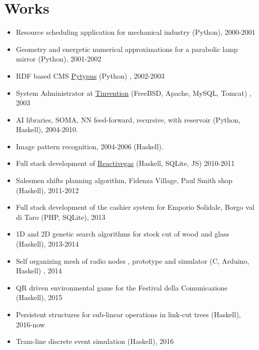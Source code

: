 \documentclass[letterpaper,10pt,oneside]{article}
\begin{document}
    \section*{Works}
        \begin{itemize}
            \item Resource scheduling application for mechanical industry (Python), 2000-2001 
            \item Geometry and energetic numerical approximations for a parabolic lamp mirror    (Python), 2001-2002 
            \item RDF based CMS \href{http://pytypus.cvs.sourceforge.net/viewvc/pytypus/}{Pytypus}  (Python) , 2002-2003 
            \item System Administrator at \href{http://tinvention.net}{Tinvention} (FreeBSD, Apache, MySQL, Tomcat) , 2003
            \item AI libraries, SOMA, NN feed-forward, recursive, with reservoir (Python, Haskell), 2004-2010. 
            \item Image pattern recognition, 2004-2006 (Haskell). 
            \item Full stack development of \href {https://lambdasistemi.net/reactivegas}{Reactivegas} (Haskell, SQLite, JS) 2010-2011 
            \item Salesmen shifts planning algorithm, Fidenza Village, Paul Smith shop (Haskell), 2011-2012 
            \item Full stack development of the cashier system for Emporio Solidale, Borgo val di Taro (PHP, SQLite), 2013 
            \item 1D and 2D genetic search algorithms for stock cut of wood and glass (Haskell), 2013-2014 
            \item Self organizing mesh of radio nodes , prototype and simulator (C, Arduino, Haskell) , 2014 
            \item QR driven environmental game for the Festival della Comunicazione (Haskell), 2015 
            \item Persistent structures for sub-linear operations in link-cut trees  (Haskell), 2016-now  
            \item Tram-line discrete event simulation (Haskell), 2016 
        \end{itemize}
\end{document}
